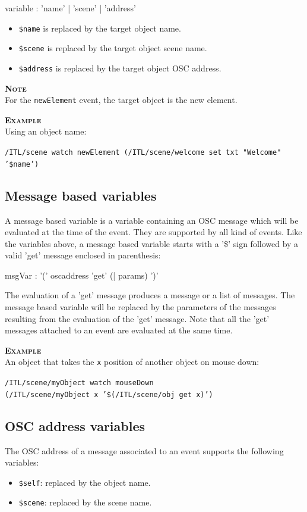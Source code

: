 \documentclass[a4paper,twoside]{report}
\newcommand{\subsublevel}[1]	{\subsection{#1}}
\newcommand{\OSC}[1]		{\texttt{#1}}
\newcommand{\values}[1]	{\texttt{#1}}
\newcommand{\example}		{\textbf{\hspace{-1.5cm}\textbf{\textsc{Example }}}}
\newcommand{\note}	[1]		{\vspace{2mm}\textbf{\hspace{-1.03cm}\textbf{\textsc{Note #1}}}}
\newcommand{\sample}	[1]			{\vspace{-2mm}\begin{center}\colorbox{mygrey}{
								\begin{minipage}[t]{0.9\columnwidth} 
								{\small \texttt{#1}}
								\end{minipage}}\end{center}}
\begin{document}
\begin{rail} 
variable :  'name' | 'scene' | 'address'
\end{rail}

\begin{itemize}
\item \OSC{\$name} is replaced by the target object name.
\item \OSC{\$scene} is replaced by the target object scene name.
\item \OSC{\$address} is replaced by the target object OSC address. 
\end{itemize}

\note{} \\
For the \OSC{newElement} event, the target object is the new element. 

\example \\
Using an object name:
\sample{/ITL/scene watch newElement (/ITL/scene/welcome set txt "Welcome" '\$name')}

\subsublevel{Message based variables}
\label{msgvar}

A message based variable is a variable containing an OSC message which will be evaluated at the time of the event. They are supported by all kind of events. Like  the variables above, a message based variable starts with a '\$' sign followed by a valid 'get' message enclosed in parenthesis:
\begin{rail} 
msgVar : '(' oscaddress 'get' (| params) ')'
\end{rail}

The evaluation of a 'get' message produces a message or a list of messages. The message based variable will be replaced by the parameters of the messages resulting from the evaluation of the 'get' message.
Note that all the 'get' messages attached to an event are evaluated at the same time.

\example \\
An object that takes the \values{x} position of another object on mouse down:
\sample{/ITL/scene/myObject watch mouseDown \\
\hspace*{3cm}(/ITL/scene/myObject x '\$(/ITL/scene/obj get x)')}


\subsublevel{OSC address variables}
\label{oscvar}
The OSC address of a message associated to an event supports the following variables:
\begin{itemize}
\item \OSC{\$self}: replaced by the object name.
\item \OSC{\$scene}: replaced by the scene name.
\end{itemize}
\end{document}
